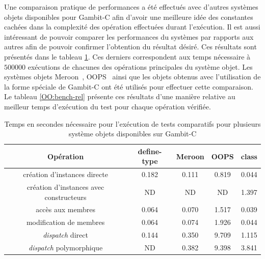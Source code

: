 \documentclass[12pt,oneside,letterpaper,francais]{book}
\newcommand{\scheme}[1]{\selectlanguage{english}{\tt #1}\selectlanguage{french}}
\begin{document}
Une comparaison pratique de performances a été effectués avec d'autres
systèmes objets disponibles pour Gambit-C afin d'avoir une meilleure
idée des constantes cachées dans la complexité des opération
effectuées durant l'exécution. Il est aussi intéressant de pouvoir
comparer les performances du systèmes par rapports aux autres afin de
pouvoir confirmer l'obtention du résultat désiré. Ces résultats sont
présentés dans le tableau \ref{OO:bench}. Ces derniers correspondent
aux temps nécessaire à $500 000$ exécutions de chacunes des opérations
principales du système objet. Les systèmes objets
Meroon~\cite{MEROON}, OOPS~\cite{OOPS} ainsi que les objets obtenus
avec l'utilisation de la forme spéciale \scheme{define-type} de
Gambit-C ont été utilisés pour effectuer cette comparaison. Le tableau
\ref{OO:bench-rel} présente ces résultats d'une manière relative au
meilleur temps d'exécution du test pour chaque opération vérifiée.

\begin{table}
  \center
  \begin{tabular}{ccccc}
    \hline
    Opération & define-type & Meroon & OOPS & class \\
    \hline \hline
    création d'instances directe            & 0.182 & 0.111 & 0.819 & 0.044\\
    création d'instances avec constructeurs & ND    & ND    & ND    & 1.397\\
    accès aux membres                       & 0.064 & 0.070 & 1.517 & 0.039\\
    modification de membres                 & 0.064 & 0.074 & 1.926 & 0.044\\
    \textit{dispatch} direct                & 0.144 & 0.350 & 9.709 & 1.115\\
    \textit{dispatch} polymorphique         & ND    & 0.382 & 9.398 & 3.841\\
    \hline
  \end{tabular}
  \caption{Temps en secondes nécessaire pour l'exécution de tests
    comparatifs pour plusieurs système objets disponibles sur
    Gambit-C}
  \label{OO:bench}
\end{table}
\end{document}
